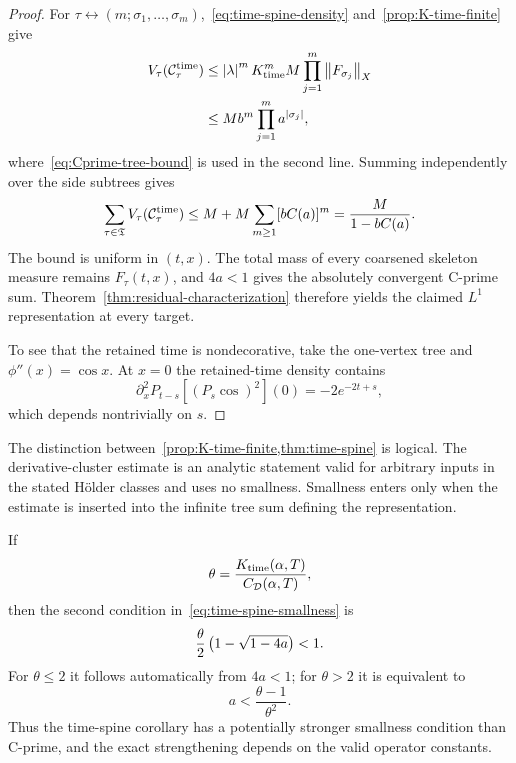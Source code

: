 \begin{proof}
For $\tau\leftrightarrow(m;\sigma_1,\ldots,\sigma_m)$,~\eqref{eq:time-spine-density} and~\cref{prop:K-time-finite} give
\begin{align*}
  V_\tau(\mathcal C_\tau^{\mathrm{time}})
  &\leq
  \left|\lambda\right|^mK_{\mathrm{time}}^mM
  \prod_{j=1}^m\left\lVert F_{\sigma_j}\right\rVert_X\\
  &\leq
  Mb^m
  \prod_{j=1}^m a^{\left|\sigma_j\right|},
\end{align*}
where~\eqref{eq:Cprime-tree-bound} is used in the second line. Summing independently over the side subtrees gives
\begin{equation*}
  \sum_{\tau\in\mathfrak T}
  V_\tau(\mathcal C_\tau^{\mathrm{time}})
  \leq
  M+M\sum_{m\geq1}[bC(a)]^m
  =
  \frac{M}{1-bC(a)}.
\end{equation*}
The bound is uniform in $(t,x)$. The total mass of every coarsened skeleton measure remains $F_\tau(t,x)$, and $4a<1$ gives the absolutely convergent C-prime sum. Theorem~\ref{thm:residual-characterization} therefore yields the claimed $L^1$ representation at every target.

To see that the retained time is nondecorative, take the one-vertex tree and $\phi''(x)=\cos x$. At $x=0$ the retained-time density contains
\begin{equation*}
  \partial_x^2P_{t-s}[(P_s\cos)^2](0)
  =
  -2e^{-2t+s},
\end{equation*}
which depends nontrivially on $s$.
\end{proof}

The distinction between~\cref{prop:K-time-finite,thm:time-spine} is logical. The derivative-cluster estimate is an analytic statement valid for arbitrary inputs in the stated H\"older classes and uses no smallness. Smallness enters only when the estimate is inserted into the infinite tree sum defining the representation.

If
\begin{equation*}
  \theta
  =
  \frac{K_{\mathrm{time}}(\alpha,T)}
  {C_{\mathcal D}(\alpha,T)},
\end{equation*}
then the second condition in~\eqref{eq:time-spine-smallness} is
\begin{equation}
  \frac\theta2
  \left(1-\sqrt{1-4a}\right)<1.
  \label{eq:time-spine-theta-condition}
\end{equation}
For $\theta\leq2$ it follows automatically from $4a<1$; for $\theta>2$ it is equivalent to
\begin{equation*}
  a<\frac{\theta-1}{\theta^2}.
\end{equation*}
Thus the time-spine corollary has a potentially stronger smallness condition than C-prime, and the exact strengthening depends on the valid operator constants.

